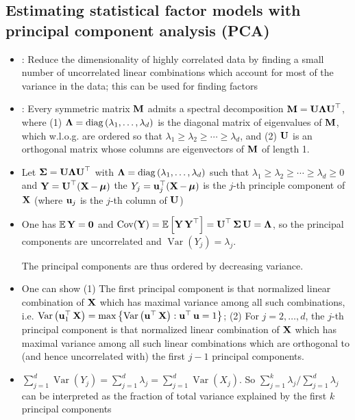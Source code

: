 \subsection*{Estimating statistical factor models with principal component analysis (PCA)}
\begin{itemize}[leftmargin=*]
    \item {}: Reduce the dimensionality of highly correlated data by finding a small number of uncorrelated linear combinations which account for most of the variance in the data; this can be used for finding factors
    \item {}: Every symmetric matrix $\vect{M}$ admits a spectral decomposition $\vect{M}=\vect{U} \vect{\Lambda} \vect{U}^{\T}$, where (1) $\vect{\Lambda} =\operatorname{diag}\left(\lambda_{1}, \ldots, \lambda_{d}\right)$ is the diagonal matrix of eigenvalues of $\vect{M}$, which w.l.o.g. are ordered so that $\lambda_{1} \geq \lambda_{2} \geq \cdots \geq \lambda_{d}$, and
(2) $\vect{U}$ is an orthogonal matrix whose columns are eigenvectors of $\vect{M}$ of length 1.
    \item Let $\mSigma=\vect{U} \vect{\Lambda} \vect{U}^{\T}$ with $\vect{\Lambda}=\operatorname{diag}\left(\lambda_{1}, \ldots, \lambda_{d}\right)$ such that $\lambda_{1} \geq \lambda_{2} \geq \cdots \geq \lambda_{d} \geq 0$ and $\Y=\vect{U}^{\T}(\X-\mmu)$ the 
$Y_{j}=\u_{j}^{\T}(\X-\mmu)$ is the $j$-th principle component of $\X$ (where $\u_{j}$ is the $j$-th column of $\vect{U}$)
    \item One has $\mathbb{E} \Y=\0$ and $\operatorname{Cov}(\Y)=\mathbb{E}\left[\Y \Y^{\T}\right]=\vect{U}^{\T} \mSigma \vect{U}=\vect{\Lambda}$, so the principal components are uncorrelated and $\operatorname{Var}\left(Y_{j}\right)=\lambda_{j}$.
    
The principal components are thus ordered by decreasing variance.

    \item One can show (1) The first principal component is that normalized linear combination of $\X$ which has maximal variance among all such combinations, i.e. $\operatorname{Var}\left(\u_{1}^{\T} \X\right)=\max \left\{\operatorname{Var}\left(\u^{\T} \X\right): \u^{\T} \u=1\right\}$; (2) For $j=2, \ldots, d$, the $j$-th principal component is that normalized linear combination of $\X$ which has maximal variance among all such linear combinations which are orthogonal to (and hence uncorrelated with) the first $j-1$ principal components.
    \item $\sum_{j=1}^{d} \operatorname{Var}\left(Y_{j}\right)=\sum_{j=1}^{d} \lambda_{j}=\sum_{j=1}^{d} \operatorname{Var}\left(X_{j}\right)$. So $\sum_{j=1}^{k} \lambda_{j} / \sum_{j=1}^{d} \lambda_{j}$ can be interpreted as the fraction of total variance explained by the first $k$ principal components
\end{itemize}





